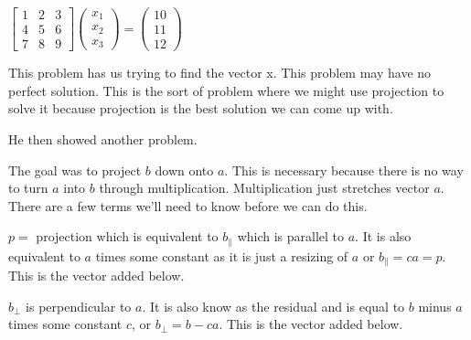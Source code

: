 $\begin{bmatrix}
1 & 2 & 3\\
4 & 5 & 6\\
7 & 8 & 9
\end{bmatrix}
\begin{pmatrix}
x_1\\
x_2\\
x_3
\end{pmatrix}
=
\begin{pmatrix}
10\\
11\\
12
\end{pmatrix}$

This problem has us trying to find the vector x. This problem may have no perfect solution. This is the sort of problem where we might use projection to solve it because projection is the best solution we can come up with.

He then showed another problem.


The goal was to project $b$ down onto $a$. This is necessary because there is no way to turn $a$ into $b$ through multiplication. Multiplication just stretches vector $a$. There are a few terms we'll need to know before we can do this.

$p =$ projection which is equivalent to $b_\|$ which is parallel to $a$. It is also equivalent to $a$ times some constant as it is just a resizing of $a$ or $b_\| = ca = p$. This is the vector added below.


$b_\perp$ is perpendicular to $a$. It is also know as the residual and is equal to $b$ minus $a$ times some constant $c$, or $b_\perp = b-ca$. This is the vector added below.

